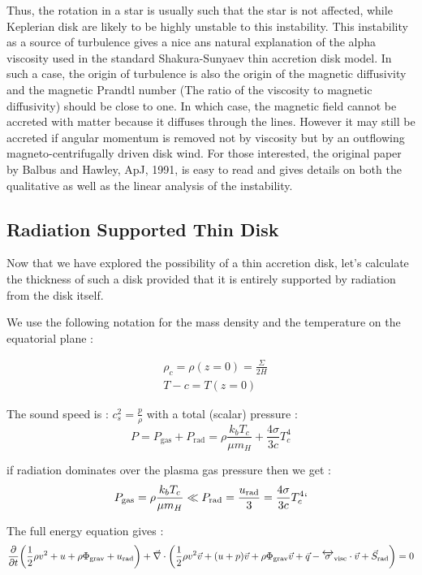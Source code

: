 \documentclass[10pt,a4paper,english]{article}
\let\originalleft\left
\let\originalright\right
\renewcommand{\left}{\mathopen{}\mathclose\bgroup\originalleft}
\renewcommand{\right}{\aftergroup\egroup\originalright}
\begin{document}
Thus, the rotation in a star is usually such that the star is not affected, while Keplerian
disk are likely to be highly unstable  to this instability. This instability as a source of
turbulence gives a  nice ans natural explanation of the alpha viscosity  used in the standard
Shakura-Sunyaev thin accretion disk model. In such a case,  the origin of turbulence is also
the origin of the magnetic diffusivity and the magnetic Prandtl number (The ratio of the viscosity to magnetic
diffusivity) should be close to one. In which case, the magnetic field cannot be accreted with matter because it
diffuses through the lines. However it may still be accreted if angular momentum is removed not by viscosity
but by an outflowing  magneto-centrifugally driven disk wind. For those interested, the original paper by Balbus
and Hawley, ApJ, 1991, is easy to read and gives details on both the qualitative as well as the linear
analysis of the instability.


\subsection{Radiation Supported Thin Disk}

Now that we have explored the possibility of a thin accretion disk, let's calculate the thickness
of such a disk provided that it is entirely supported by radiation from the disk itself.

We use the following notation for the mass density and the temperature on the equatorial  plane :

\begin{align}
    & \rho_c = \rho(z=0) = \frac{\Sigma}{2H} \\
       & T-c = T(z=0)
\end{align}

The sound speed is : $c_s^2 = \frac{p}{\rho}$ with a total (scalar) pressure :
\begin{equation}
    P = P_\mathrm{gas} + P_\mathrm{rad}  = \rho \frac{k_b T_c}{\mu m_H} + \frac{4\sigma}{3 c}T_c^4
\end{equation}

if radiation dominates over the plasma gas pressure then we get :
\begin{equation}
    P_\mathrm{gas} = \rho \frac{k_b T_c}{\mu m_H} \ll P_\mathrm{rad} = \frac{u_\mathrm{rad}}{3} = \frac{4\sigma}{3 c}T_c^4`
\end{equation}

The full energy equation gives :
\begin{equation}
    \frac{\partial}{\partial t } \left(
    \frac{1}{2}\rho v^2 + u + \rho \Phi_\mathrm{grav} + u_\mathrm{rad} \right) +
    \vec{\nabla}\cdot\left(
    \frac{1}{2}\rho v^2 \vec{v} + (u + p)\vec{v} + \rho \Phi_\mathrm{grav}\vec{v} +
    \vec{q} - \tens{\sigma}_\mathrm{visc}\cdot\vec{v} + \vec{S}_\mathrm{rad}
    \right) = 0
\end{equation}
\end{document}
